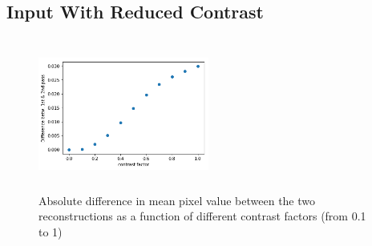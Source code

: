 \documentclass{article}
\begin{document}
  
  
  
 \subsection{Input With Reduced Contrast}
\begin{figure}[H]
      \centering
      \includegraphics[width=0.5\textwidth,height=5cm,keepaspectratio]{img/appendix/contrast/diff.png}
            \caption{Absolute difference in mean pixel value between the two reconstructions as a function of different contrast factors (from 0.1 to 1)}
      \label{fig:noiseact}
  \end{figure}
\end{document}
